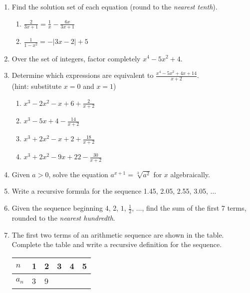 \documentclass[12pt, twoside]{article}
\begin{document}
\begin{enumerate}[itemsep=0.5cm]
\item Find the solution set of each equation (round to the \emph{nearest tenth}).
\begin{multicols}{2}
    \begin{enumerate}
        \item $\displaystyle \frac{2}{3x+1} = \frac{1}{x} - \frac{6x}{3x+1}$
        \item $\displaystyle \frac{1}{1-x^2} = - |3x-2|+5$
    \end{enumerate}
\end{multicols}

\newpage
\item Over the set of integers, factor completely $x^4-5x^2+4$. \vspace{3cm} %

\item Determine which expressions are equivalent to $\displaystyle \frac{x^4-5x^2+4x+14}{x+2}$. \\[0.25cm]
    (hint: substitute $x=0$ and $x=1$)
    \begin{multicols}{2}
    \begin{enumerate}[itemsep=2cm]
        \item $\displaystyle x^3-2x^2-x+6+\frac{2}{x+2}$
        \item $\displaystyle x^3-5x+4-\frac{14}{x+2}$
        \item $\displaystyle x^3+2x^2-x+2+\frac{18}{x+2}$
        \item $\displaystyle x^3+2x^2-9x+22-\frac{30}{x+2}$
    \end{enumerate}
    \end{multicols} \vspace{2cm}

\item Given $a > 0$, solve the equation $a^{x+1} = \sqrt[3]{a^2}$ for $x$ algebraically. %
\vspace{2cm}

\newpage
\item Write a recursive formula for the sequence 1.45, 2.05, 2.55, 3.05, $\ldots$ \vspace{3cm}


\item Given the sequence beginning  $4$, 2, $1$, $\frac{1}{2}$, $\ldots$, find the sum of the first 7 terms, rounded to the \emph{nearest hundredth}. \vspace{3cm}

\item The first two terms of an arithmetic sequence are shown in the table. Complete the table and write a recursive definition for the sequence.
\begin{center}
\begin{tabular}{|p{1cm}|p{1cm}|p{1cm}|p{1cm}|p{1cm}|p{1cm}|}
    \hline
    $n$ & 1 & 2 & 3 & 4 & 5 \\
    \hline
    $a_n$ & 3 & 9 & & & \\[0.25cm]
    \hline
\end{tabular}
\end{center}


\end{enumerate}
\end{document}
